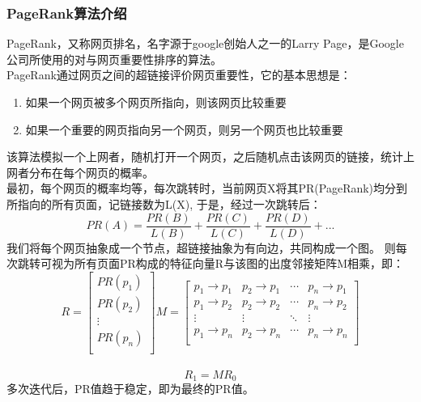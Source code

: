 \documentclass[a4paper,UTF8]{article}
\numberwithin{equation}{section}
\begin{document}
\subsubsection{PageRank算法介绍}
PageRank，又称网页排名，名字源于google创始人之一的Larry Page，是Google公司所使用的对与网页重要性排序的算法。\\
PageRank通过网页之间的超链接评价网页重要性，它的基本思想是：\\
\begin{enumerate}[1)]
    \item 如果一个网页被多个网页所指向，则该网页比较重要
    \item 如果一个重要的网页指向另一个网页，则另一个网页也比较重要
\end{enumerate}
该算法模拟一个上网者，随机打开一个网页，之后随机点击该网页的链接，统计上网者分布在每个网页的概率。\\
最初，每个网页的概率均等，每次跳转时，当前网页X将其PR(PageRank)均分到所指向的所有页面，记链接数为L(X),
于是，经过一次跳转后：\\
$$
PR(A)=\frac{PR(B)}{L(B)}+\frac{PR(C)}{L(C)}+\frac{PR(D)}{L(D)}+...
$$
我们将每个网页抽象成一个节点，超链接抽象为有向边，共同构成一个图。
则每次跳转可视为所有页面PR构成的特征向量R与该图的出度邻接矩阵M相乘，即：\\
$$R=
\begin{bmatrix}
    PR(p_1) \\
    PR(p_2)\\
    \vdots\\
    PR(p_n)\\
\end{bmatrix}
M=
\begin{bmatrix}
    p_1 \rightarrow p_1 & p_2 \rightarrow p_1 & \cdots & p_n \rightarrow p_1\\
    p_1 \rightarrow p_2 & p_2 \rightarrow p_2 & \cdots & p_n \rightarrow p_2\\
    \vdots & \vdots & \ddots & \vdots\\
    p_1 \rightarrow p_n & p_2 \rightarrow p_n & \cdots & p_n \rightarrow p_n\\
\end{bmatrix}
$$
\\
$$
R_1=M R_0
$$
多次迭代后，PR值趋于稳定，即为最终的PR值。
\end{document}
